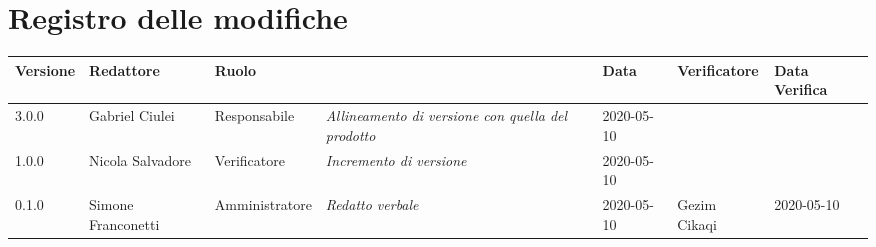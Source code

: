 \section*{Registro delle modifiche}
\renewcommand{\arraystretch}{1.8}

  \setlength\LTleft{-1.7cm}
  \begin{longtable}{|p{1.7cm}|p{2cm}|p{2.5cm}|p{3cm}|p{1.7cm}|p{2cm}|p{2.3cm}|}
    \hline

    \rowcolor{header}
    \textbf{Versione} & \textbf{Redattore} & \textbf{Ruolo} & \centering{\textbf{Descrizione}} & \textbf{Data} & \textbf{Verificatore} & \textbf{Data Verifica}\\

    \hline
    3.0.0 & Gabriel Ciulei & Responsabile & \small{\textit{Allineamento di versione con quella del prodotto}} & 2020-05-10 & &\\
    1.0.0 & Nicola Salvadore & Verificatore & \small{\textit{Incremento di versione}} & 2020-05-10 & &\\
	0.1.0 & Simone Franconetti & Amministratore & \small{\textit{Redatto verbale}} & 2020-05-10 & Gezim Cikaqi & 2020-05-10 \\
    \hline
  \end{longtable}
  \setlength\LTleft{0cm}
